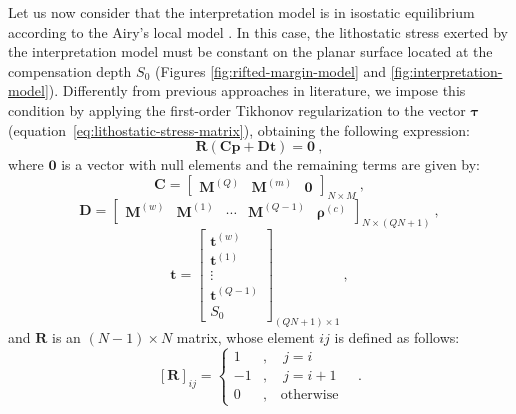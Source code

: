 \documentclass[manuscript]{geophysics}
\begin{document}
Let us now consider that the interpretation model is in isostatic equilibrium
according to the Airy's local model \citep[e.g.,][]{turcotte-schubert2002,
hofmann-wellenhof-moritz2005, lowrie2007}. 
In this case, the lithostatic stress exerted by the interpretation model
must be constant on the planar surface located at the compensation depth $S_{0}$
(Figures \ref{fig:rifted-margin-model} and \ref{fig:interpretation-model}).
Differently from previous approaches in literature, we impose this condition 
by applying the first-order Tikhonov regularization
\citep{aster-etal2005} to the vector $\boldsymbol{\tau}$
(equation~\ref{eq:lithostatic-stress-matrix}), obtaining the
following expression:
\begin{equation}
\mathbf{R} \left( \mathbf{C} \mathbf{p} + \mathbf{D} \mathbf{t} \right) = \mathbf{0} 
\: ,
\label{eq:tik1-lithostatic-stress}
\end{equation}
where $\mathbf{0}$ is a vector with null elements and the remaining terms are given by:
\begin{equation}
\mathbf{C} = \begin{bmatrix}
\mathbf{M}^{(Q)} & \mathbf{M}^{(m)} & \mathbf{0}
\end{bmatrix}_{N \times M} \: ,
\label{eq:matrix-C}
\end{equation}
\begin{equation}
\mathbf{D} = \begin{bmatrix}
\mathbf{M}^{(w)} & \mathbf{M}^{(1)} & \cdots & \mathbf{M}^{(Q-1)} &
\boldsymbol{\rho}^{(c)}
\end{bmatrix}_{N \times \left( QN + 1 \right)} \: ,
\label{eq:matrix-D}
\end{equation}
\begin{equation}
\mathbf{t} = \begin{bmatrix}
\mathbf{t}^{(w)} \\ \mathbf{t}^{(1)} \\ \vdots \\ \mathbf{t}^{(Q-1)} \\ S_{0}
\end{bmatrix}_{\left( QN + 1 \right) \times 1}\: ,
\label{eq:vector-t}
\end{equation}
and $\mathbf{R}$ is an $\left( N-1 \right) \times N$ matrix, whose element 
$ij$ is defined as follows:
\begin{equation}
\left[ \mathbf{R} \right]_{ij} = \begin{cases}
1 &, \quad j = i \\
-1 &, \quad j = i + 1 \\
0 &, \quad \text{otherwise}
\end{cases} \quad .
\label{eq:matrix-R}
\end{equation}
\end{document}
